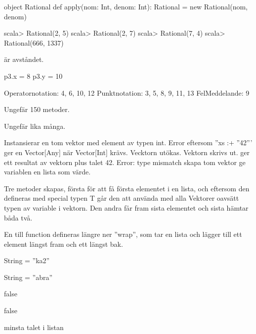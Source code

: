 \Subtask {}

\Subtask 
\begin{REPLnonum}
object Rational { 
def apply(nom: Int, denom: Int): Rational = new Rational(nom, denom)
}
\end{REPLnonum}

\Subtask 
\begin{REPL}
scala> Rational(2, 5)
scala> Rational(2, 7)
scala> Rational(7, 4)
scala> Rational(666, 1337)
\end{REPL}

\Task %
\Subtask {}

\Task %

 är avståndet.

\Subtask 
p3.x = 8
p3.y = 10

\Task %

\Subtask 
Operatornotation:	4, 6, 10, 12
Punktnotation:		3, 5, 8, 9, 11, 13
FelMeddelande:		9

\Task %

\Subtask  Ungefär 150 metoder.

\Subtask  Ungefär lika många.

\Task %

\Subtask 
Instansierar en tom vektor med element av typen int.
Error eftersom ''xs :+ ''42''' ger en Vector[Any] när Vector[Int] krävs.
Vecktorn utökas.
Vektorn skrivs ut.
ger ett resultat av vektorn plus talet 42.
Error: type mismatch
skapa tom vektor
ge variablen en lista som värde.

\Subtask 
Tre metoder skapas, första för att få första elementet i en lista, och eftersom den defineras med special typen T går den att använda med alla Vektorer oavsätt typen av variable i vektorn. Den andra får fram sista elementet och sista hämtar båda två.

En till function defineras längre ner ''wrap'', som tar en lista och lägger till ett element längst fram och ett längst bak.

\Task %

\Subtask  String = ''ka2''

\Subtask  String = ''abra''

\Subtask  false

\Subtask  false



\Subtask  minsta talet i listan

